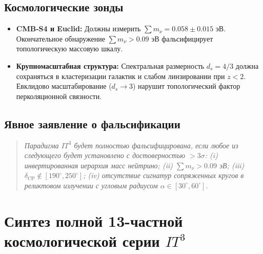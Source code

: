 \documentclass[12pt,a4paper]{article}
\begin{document}
\subsection{Космологические зонды}
\begin{itemize}
    \item \textbf{CMB-S4 и Euclid:} Должны измерить $\sum m_\nu = 0.058 \pm 0.015$ эВ. Окончательное обнаружение $\sum m_\nu > 0.09$ эВ фальсифицирует топологическую массовую шкалу.
    \item \textbf{Крупномасштабная структура:} Спектральная размерность $d_s = 4/3$ должна сохраняться в кластеризации галактик и слабом линзировании при $z < 2$. Евклидово масштабирование ($d_s \to 3$) нарушит топологический фактор перколяционной связности.
\end{itemize}

\subsection{Явное заявление о фальсификации}
\begin{quote}
\textit{Парадигма $IT^3$ будет полностью фальсифицирована, если любое из следующего будет установлено с достоверностью $>3\sigma$: (i) инвертированная иерархия масс нейтрино; (ii) $\sum m_\nu > 0.09$ эВ; (iii) $\delta_{\text{CP}} \notin [190^\circ, 250^\circ]$; (iv) отсутствие сигнатур сопряженных кругов в реликтовом излучении с угловым радиусом $\alpha \in [30^\circ, 60^\circ]$.}
\end{quote}

\section{Синтез полной 13-частной космологической серии $IT^3$}
\end{document}

